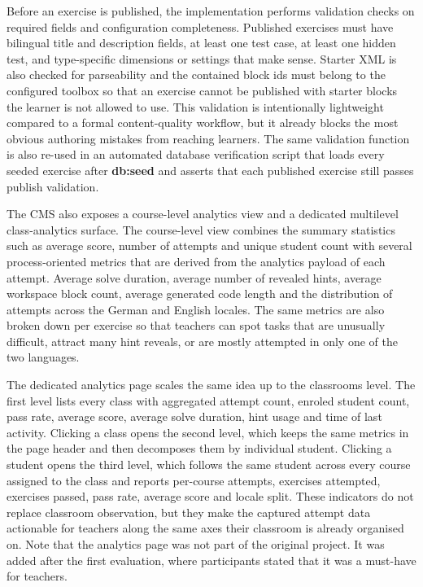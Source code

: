 Before an exercise is published, the implementation performs validation checks on required fields and 
configuration completeness. Published exercises must have bilingual title and description fields, at least one test case, 
at least one hidden test, and type-specific dimensions or settings that make sense.
Starter XML is also checked for parseability and the contained block ids must belong to the configured toolbox so that an 
exercise cannot be published with starter blocks the learner is not allowed to use.
This validation is intentionally lightweight compared to a formal content-quality workflow, but it already blocks 
the most obvious authoring mistakes from reaching learners.
The same validation function is also re-used in an automated database verification script that loads every seeded 
exercise after \textbf{db:seed} and asserts that each published exercise still passes publish validation.

The CMS also exposes a course-level analytics view and a dedicated multilevel class-analytics surface. 
The course-level view combines the summary statistics such as average score, number of attempts and unique student count 
with several process-oriented metrics that are derived from the analytics payload of each attempt.
Average solve duration, average number of revealed hints, average workspace block count, average generated code length and the 
distribution of attempts across the German and English locales.
The same metrics are also broken down per exercise so that teachers can spot tasks that are unusually difficult, attract many 
hint reveals, or are mostly attempted in only one of the two languages.

The dedicated analytics page scales the same idea up to the classrooms level. The first level lists every 
class with aggregated attempt count, enroled student count, pass rate, average score, average solve duration, hint usage and 
time of last activity. Clicking a class opens the second level, which keeps the same metrics in the page header and 
then decomposes them by individual student. Clicking a student opens the third level, which follows the same student 
across every course assigned to the class and reports per-course attempts, exercises attempted, exercises passed, pass rate, 
average score and locale split. These indicators do not replace classroom observation, but they make the captured attempt 
data actionable for teachers along the same axes their classroom is already organised on.
Note that the analytics page was not part of the original project. It was added after the first evaluation, where participants stated 
that it was a must-have for teachers.


